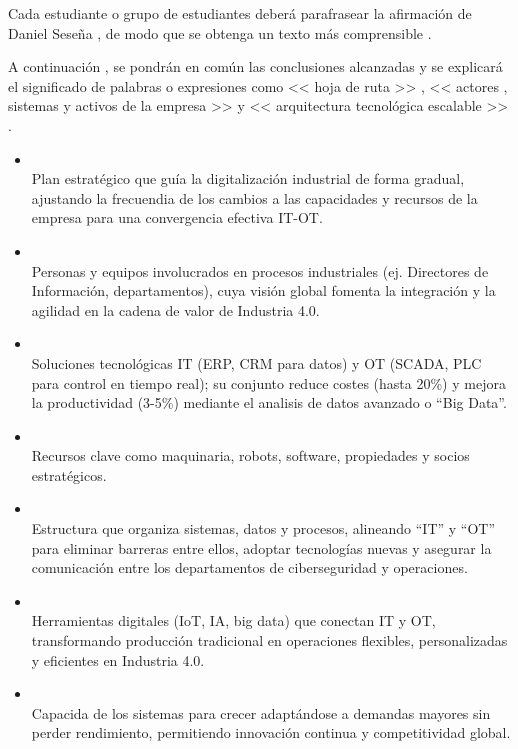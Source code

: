 Cada estudiante o grupo de estudiantes deberá parafrasear la afirmación de Daniel Seseña , de modo que se obtenga un texto más comprensible . 
\vspace{1em}

A continuación , se pondrán en común las conclusiones alcanzadas y se explicará el significado de palabras o expresiones como << hoja de ruta >> ,
<< actores , sistemas y activos de la empresa >> y << arquitectura tecnológica escalable >> .

\begin{itemize}[label=\textbullet { -}]
	\item {} \\
		Plan estratégico que guía la digitalización industrial de forma gradual, ajustando la frecuendia  de los cambios a las capacidades y recursos de la empresa  para una convergencia efectiva IT-OT.
	\item {} \\
		Personas y equipos involucrados en procesos industriales (ej. Directores de Información, departamentos), cuya visión global fomenta la integración y la agilidad  en la cadena de valor de Industria 4.0.
	\item {}\\
		Soluciones tecnológicas IT (ERP, CRM para datos) y OT (SCADA, PLC para control en tiempo real); su conjunto reduce costes (hasta 20\%) y mejora la productividad (3-5\%) mediante el analisis de datos 
		avanzado o ``Big Data''.
	\item {}\\
		Recursos clave como maquinaria, robots, software, propiedades y socios estratégicos.
	\item {}\\
		Estructura que organiza sistemas, datos y procesos, alineando ``IT'' y ``OT'' para eliminar barreras entre ellos, adoptar tecnologías nuevas y asegurar  la comunicación entre 
		los departamentos de ciberseguridad y operaciones.
	\item {}\\
		Herramientas digitales (IoT, IA, big data) que conectan IT y OT, transformando producción tradicional en operaciones flexibles, personalizadas y eficientes en Industria 4.0.
	\item {}\\
		Capacida de los sistemas para crecer adaptándose a demandas mayores sin perder rendimiento, permitiendo innovación continua y competitividad global.
\end{itemize}




\clearpage

